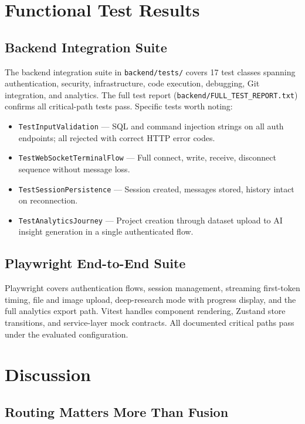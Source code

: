 \section{Functional Test Results}
\label{sec:tests}

\subsection{Backend Integration Suite}

The backend integration suite in \texttt{backend/tests/} covers 17 test
classes spanning authentication, security, infrastructure, code execution,
debugging, Git integration, and analytics. The full test report
(\texttt{backend/FULL\_TEST\_REPORT.txt}) confirms all critical-path tests
pass. Specific tests worth noting:

\begin{itemize}
    \item \texttt{TestInputValidation} --- SQL and command injection strings
    on all auth endpoints; all rejected with correct HTTP error codes.
    \item \texttt{TestWebSocketTerminalFlow} --- Full connect, write,
    receive, disconnect sequence without message loss.
    \item \texttt{TestSessionPersistence} --- Session created, messages
    stored, history intact on reconnection.
    \item \texttt{TestAnalyticsJourney} --- Project creation through
    dataset upload to AI insight generation in a single authenticated flow.
\end{itemize}

\subsection{Playwright End-to-End Suite}

Playwright covers authentication flows, session management, streaming
first-token timing, file and image upload, deep-research mode with
progress display, and the full analytics export path. Vitest handles
component rendering, Zustand store transitions, and service-layer mock
contracts. All documented critical paths pass under the evaluated
configuration.

\section{Discussion}
\label{sec:discussion}

\subsection{Routing Matters More Than Fusion}

